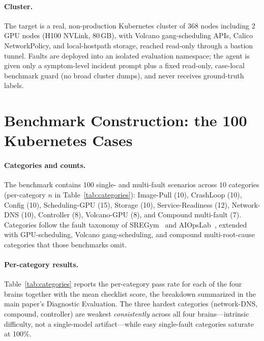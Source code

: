 \documentclass[letterpaper]{article}
\begin{document}
\paragraph{Cluster.}
The target is a real, non-production Kubernetes cluster of 368 nodes including 2 GPU nodes (H100 NVLink, 80\,GB), with Volcano gang-scheduling APIs, Calico NetworkPolicy, and local-hostpath storage, reached read-only through a bastion tunnel.
Faults are deployed into an isolated evaluation namespace; the agent is given only a symptom-level incident prompt plus a fixed read-only, case-local benchmark guard (no broad cluster dumps), and never receives ground-truth labels.

\section{Benchmark Construction: the 100 Kubernetes Cases}
\label{app:cases}

\paragraph{Categories and counts.}
The benchmark contains 100 single- and multi-fault scenarios across 10 categories (per-category $n$ in Table~\ref{tab:categories}): Image-Pull (10), CrashLoop (10), Config (10), Scheduling-GPU (15), Storage (10), Service-Readiness (12), Network-DNS (10), Controller (8), Volcano-GPU (8), and Compound multi-fault (7).
Categories follow the fault taxonomy of SREGym~\cite{clark2026sregym} and AIOpsLab~\cite{chen2025aiopslab}, extended with GPU-scheduling, Volcano gang-scheduling, and compound multi-root-cause categories that those benchmarks omit.

\paragraph{Per-category results.}
Table~\ref{tab:categories} reports the per-category pass rate for each of the four brains together with the mean checklist score, the breakdown summarized in the main paper's Diagnostic Evaluation.
The three hardest categories (network-DNS, compound, controller) are weakest \emph{consistently} across all four brains---intrinsic difficulty, not a single-model artifact---while easy single-fault categories saturate at 100\%.
\end{document}
